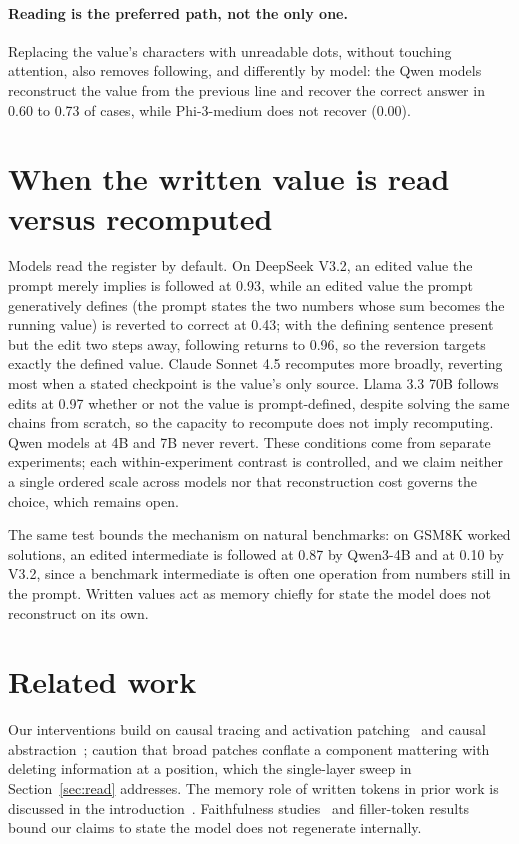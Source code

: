 \documentclass{article}
\begin{document}
\paragraph{Reading is the preferred path, not the only one.} Replacing the value's characters with unreadable dots, without touching attention, also removes following, and differently by model: the Qwen models reconstruct the value from the previous line and recover the correct answer in 0.60 to 0.73 of cases, while Phi-3-medium does not recover (0.00).

\section{When the written value is read versus recomputed}
\label{sec:check}

Models read the register by default. On DeepSeek V3.2, an edited value the prompt merely implies is followed at 0.93, while an edited value the prompt generatively defines (the prompt states the two numbers whose sum becomes the running value) is reverted to correct at 0.43; with the defining sentence present but the edit two steps away, following returns to 0.96, so the reversion targets exactly the defined value. Claude Sonnet 4.5 recomputes more broadly, reverting most when a stated checkpoint is the value's only source. Llama 3.3 70B follows edits at 0.97 whether or not the value is prompt-defined, despite solving the same chains from scratch, so the capacity to recompute does not imply recomputing. Qwen models at 4B and 7B never revert. These conditions come from separate experiments; each within-experiment contrast is controlled, and we claim neither a single ordered scale across models nor that reconstruction cost governs the choice, which remains open.

The same test bounds the mechanism on natural benchmarks: on GSM8K worked solutions, an edited intermediate is followed at 0.87 by Qwen3-4B and at 0.10 by V3.2, since a benchmark intermediate is often one operation from numbers still in the prompt. Written values act as memory chiefly for state the model does not reconstruct on its own.

\section{Related work}

Our interventions build on causal tracing and activation patching~\citep{meng2022rome} and causal abstraction~\citep{geiger2021causal}; \citet{heimersheim2024patching} caution that broad patches conflate a component mattering with deleting information at a position, which the single-layer sweep in Section~\ref{sec:read} addresses. The memory role of written tokens in prior work is discussed in the introduction~\citep{merrill2024expressive, lanchantin2023selfnotes, zhu2025variables, shih2026registers}. Faithfulness studies~\citep{turpin2023unfaithful, lanham2023faithfulness} and filler-token results~\citep{pfau2024dot} bound our claims to state the model does not regenerate internally.
\end{document}

